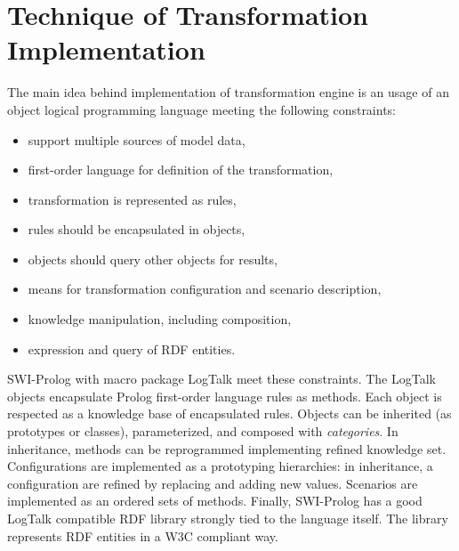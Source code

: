 \documentclass[conference]{IEEEtran} \IEEEoverridecommandlockouts
\begin{document}
\section{Technique of Transformation Implementation} \label{sec:tech-imp} 

The main idea behind implementation of transformation engine is an usage of an object logical programming language meeting the following constraints: \begin{itemize} \item support multiple sources of model data, \item first-order language for definition of the transformation, \item transformation is represented as rules, \item rules should be encapsulated in objects, \item objects should query other objects for results, \item means for transformation configuration and scenario description, \item knowledge manipulation, including composition, \item expression and query of RDF entities. \end{itemize} 

SWI-Prolog with macro package LogTalk meet these constraints. The LogTalk objects encapsulate Prolog first-order language rules as methods. Each object is respected as a knowledge base of encapsulated rules. Objects can be inherited (as prototypes or classes), parameterized, and composed with \emph{categories}. In inheritance, methods can be reprogrammed implementing refined knowledge set. Configurations are implemented as a prototyping hierarchies: in inheritance, a configuration are refined by replacing and adding new values. Scenarios are implemented as an ordered sets of methods. Finally, SWI-Prolog has a good LogTalk compatible RDF library strongly tied to the language itself. The library represents RDF entities in a W3C compliant way. 
\end{document}

